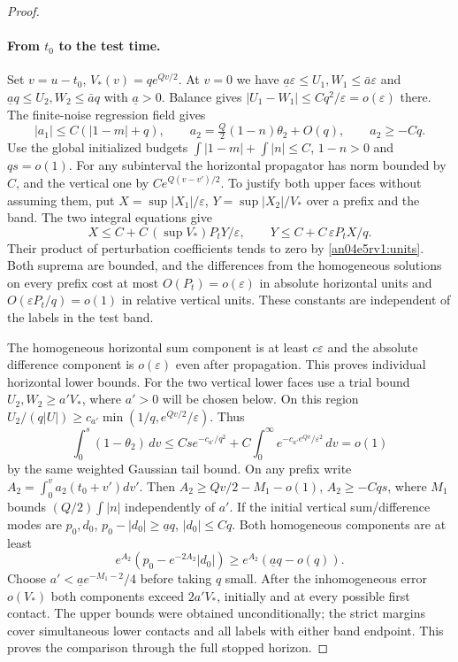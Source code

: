 \documentclass[11pt]{article}
\newcommand{\eps}{\varepsilon}
\begin{document}
\begin{proof}
\paragraph{From $t_0$ to the test time.}
Set $v=u-t_0$, $V_*(v)=q e^{Qv/2}$. At $v=0$ we have $\underline a\eps\le U_1,W_1\le\bar a\eps$ and $\underline a q\le U_2,W_2\le\bar a q$ with $\underline a>0$. Balance gives $|U_1-W_1|\le Cq^2/\eps=o(\eps)$ there. The finite-noise regression field gives
\[
 |a_1|\le C(|1-m|+q),\qquad
 a_2=\tfrac Q2(1-n)\theta_2+O(q),\qquad a_2\ge-Cq .
\]
Use the global initialized budgets $\int|1-m|+\int |n|\le C$, $1-n>0$ and $q s=o(1)$. For any subinterval the horizontal propagator has norm bounded by $C$, and the vertical one by $C e^{Q(v-v')/2}$. To justify both upper faces without assuming them, put $X=\sup |X_1|/\eps$, $Y=\sup |X_2|/V_*$ over a prefix and the band. The two integral equations give
\[
 X\le C+C\,(\sup V_*) P_t Y/\eps,\qquad
 Y\le C+C\,\eps P_t X/q .
\]
Their product of perturbation coefficients tends to zero by \eqref{an04e5rv1:units}. Both suprema are bounded, and the differences from the homogeneous solutions on every prefix cost at most $O(P_t)=o(\eps)$ in absolute horizontal units and $O(\eps P_t/q)=o(1)$ in relative vertical units. These constants are independent of the labels in the test band.

The homogeneous horizontal sum component is at least $c\eps$ and the absolute difference component is $o(\eps)$ even after propagation. This proves individual horizontal lower bounds. For the two vertical lower faces use a trial bound $U_2,W_2\ge a' V_*$, where $a'>0$ will be chosen below. On this region $U_2/(q|U|)\ge c_{a'}\min(1/q,e^{Qv/2}/\eps)$. Thus
\[
 \int_0^s(1-\theta_2)\,dv
 \le C s e^{-c_{a'}/q^2}
     +C\int_0^\infty e^{-c_{a'}e^{Qv}/\eps^2}\,dv=o(1)
\]
by the same weighted Gaussian tail bound. On any prefix write $A_2=\int_0^v a_2(t_0+v')dv'$. Then
$A_2\ge Qv/2-M_1-o(1)$, $A_2\ge-Cqs$, where $M_1$ bounds $(Q/2)\int|n|$ independently of $a'$. If the initial vertical sum/difference modes are $p_0,d_0$, $p_0-|d_0|\ge\underline a q$, $|d_0|\le Cq$. Both homogeneous components are at least
\[
 e^{A_2}(p_0-e^{-2A_2}|d_0|)
 \ge e^{A_2}(\underline a q-o(q)).
\]
Choose $a'<\underline a e^{-M_1-2}/4$ before taking $q$ small. After the inhomogeneous error $o(V_*)$ both components exceed $2a'V_*$, initially and at every possible first contact. The upper bounds were obtained unconditionally; the strict margins cover simultaneous lower contacts and all labels with either band endpoint. This proves the comparison through the full stopped horizon.


\end{proof}
\end{document}
